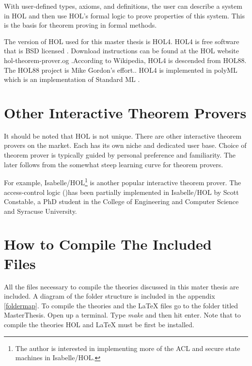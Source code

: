 \documentclass[../../main/main.tex]{subfiles}
\begin{document}
With user-defined types, axioms, and definitions, the user can describe a system in HOL and then use HOL's formal logic to prove properties of this system.  This is the basis for theorem proving in formal methods.

The version of HOL used for this master thesis is HOL4.  HOL4 is free software that is BSD licensed \cite{BSDlicenses}.  Download instructions can be found at the HOL website hol-theorem-prover.og \cite{HOL}.According to Wikipedia, HOL4 is descended from HOL88.  The HOL88 project is Mike Gordon's effort..  HOL4 is implemented in polyML which is an implementation of Standard ML \cite{HOLwiki}.

\section{Other Interactive Theorem Provers}
It should be noted that HOL is not unique. There are other interactive theorem provers on the market. Each has its own niche and dedicated user base.  Choice of theorem prover is typically guided by personal preference and familiarity. The later follows from the somewhat steep learning curve for theorem provers. 

For example, Isabelle/HOL\footnote{The author is interested in implementing more of the ACL and secure state machines in Isabelle/HOL.} is another popular interactive theorem prover.  The access-control logic ()has been partially implemented in Isabelle/HOL by Scott Constable, a PhD student in the College of Engineering and Computer Science and Syracuse University.  

\section{How to Compile The Included Files}
All the files necessary to compile the theories discussed in this mater thesis are included.  A diagram of the folder structure is included in the appendix \ref{foldermap}.  To compile the theories and the LaTeX files go to the folder titled MasterThesis.  Open up a terminal.  Type \emph{make} and then hit enter.  Note that to compile the theories HOL and LaTeX must be first be installed.  
\end{document}
